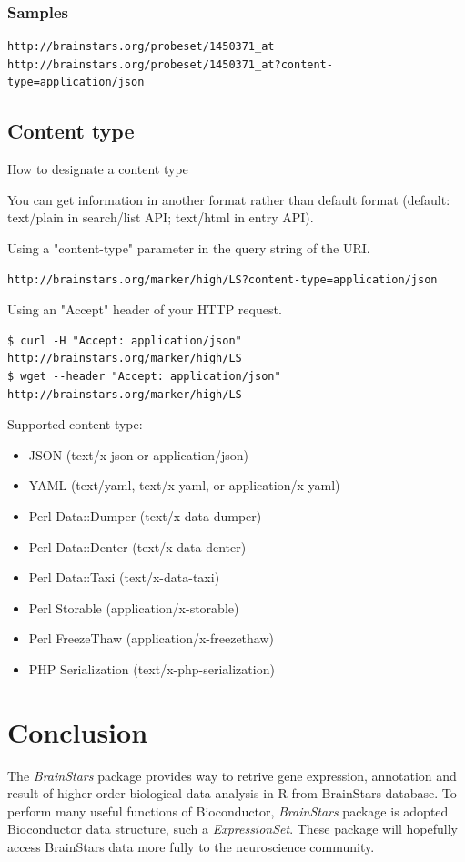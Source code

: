 \documentclass[12pt,fullpage]{article}
\newcommand{\Rpackage}[1]{{\textit{#1}}}
\newcommand{\Rclass}[1]{{\textit{#1}}}
\begin{document}
\subsubsection{Samples}
\begin{verbatim}
http://brainstars.org/probeset/1450371_at
http://brainstars.org/probeset/1450371_at?content-type=application/json
\end{verbatim}

\subsection{Content type}
How to designate a content type

You can get information in another format rather than default format (default: text/plain in search/list API; text/html in entry API).

Using a "content-type" parameter in the query string of the URI. 
\begin{verbatim}
http://brainstars.org/marker/high/LS?content-type=application/json
\end{verbatim}

Using an "Accept" header of your HTTP request. 
\begin{verbatim}
$ curl -H "Accept: application/json" http://brainstars.org/marker/high/LS 
$ wget --header "Accept: application/json" http://brainstars.org/marker/high/LS
\end{verbatim}

Supported content type:
\begin{itemize}
  \item JSON (text/x-json or application/json)
  \item YAML (text/yaml, text/x-yaml, or application/x-yaml)
  \item Perl Data::Dumper (text/x-data-dumper)
  \item Perl Data::Denter (text/x-data-denter)
  \item Perl Data::Taxi (text/x-data-taxi)
  \item Perl Storable (application/x-storable)
  \item Perl FreezeThaw (application/x-freezethaw)
  \item PHP Serialization (text/x-php-serialization)
\end{itemize}

\section{Conclusion}
The \Rpackage{BrainStars} package provides way to retrive gene expression, 
annotation and result of higher-order biological data analysis in R from 
BrainStars database. To perform many useful functions of Bioconductor, 
\Rpackage{BrainStars} package is adopted Bioconductor data structure, 
such a \Rclass{ExpressionSet}. These package will hopefully access BrainStars 
data more fully to the neuroscience community.
\end{document}
